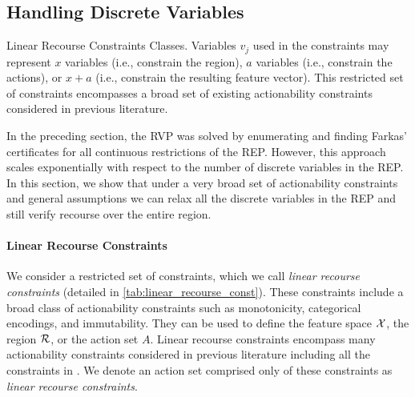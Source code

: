 \subsection{Handling Discrete Variables} \label{sec:scaling}
\begin{table*}[t]
    \centering
    \resizebox{\linewidth}{!}{
    
    }
    \caption{Linear Recourse Constraints Classes. Variables $v_j$ used in the constraints may represent $x$ variables (i.e., constrain the region), $a$ variables (i.e., constrain the actions), or $x + a$ (i.e., constrain the resulting feature vector). This restricted set of constraints encompasses a broad set of existing actionability constraints considered in previous literature.} \label{tab:linear_recourse_const}
\end{table*}

In the preceding section, the RVP was solved by enumerating and finding Farkas' certificates for all continuous restrictions of the REP. However, this approach scales exponentially with respect to the number of discrete variables in the REP. In this section, we show that under a very broad set of actionability constraints and general assumptions we can relax all the discrete variables in the REP and still verify recourse over the entire region.

\paragraph{Linear Recourse Constraints} 
We consider a restricted set of constraints, which we call \emph{linear recourse constraints} (detailed in \cref{tab:linear_recourse_const}). These constraints include a broad class of actionability constraints such as monotonicity, categorical encodings, and immutability. They can be used to define the feature space ${\cal X}$, the region ${\cal R}$, or the action set $A$. Linear recourse constraints encompass many actionability constraints considered in previous literature including all the constraints in \citep{ustun2019actionable, russell2019efficient,kothari2023prediction}. We denote an action set comprised only of these constraints as \textit{linear recourse constraints}. %

%


